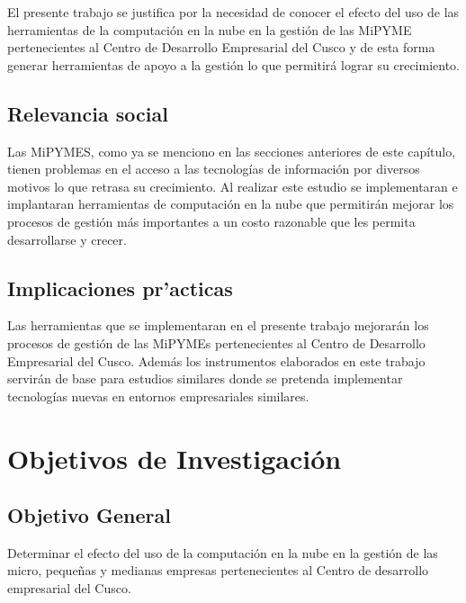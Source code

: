 El presente trabajo se justifica por la necesidad de conocer el efecto del uso
de las herramientas de la computación en la nube en la gestión de las MiPYME
pertenecientes al Centro de Desarrollo Empresarial del Cusco y de esta forma
generar herramientas de apoyo a la gestión lo que permitirá lograr su crecimiento.


\subsection{Relevancia social}
Las MiPYMES, como ya se menciono en las secciones anteriores de este capítulo,
tienen problemas en el acceso a las tecnologías de información por diversos motivos
lo que retrasa su crecimiento. Al realizar este estudio se implementaran e implantaran
herramientas de computación en la nube que permitirán mejorar los procesos de gestión
más importantes a un costo razonable que les permita desarrollarse y crecer.

\subsection{Implicaciones pr'acticas}
Las herramientas que se implementaran en el presente trabajo mejorarán los procesos
de gestión de las MiPYMEs pertenecientes al Centro de Desarrollo Empresarial del Cusco.
Además los instrumentos elaborados en este trabajo servirán de base para estudios
similares donde se pretenda implementar tecnologías nuevas en entornos empresariales
similares.


\section{Objetivos de Investigación}
\subsection{Objetivo General}
Determinar el efecto del uso de la computación en la nube en la gestión de
las micro, pequeñas y medianas empresas pertenecientes al Centro de desarrollo
empresarial del Cusco.
